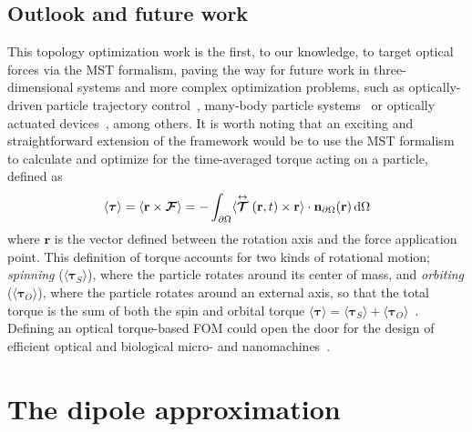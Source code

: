 \subsection*{Outlook and future work}

This topology optimization work is the first, to our knowledge, to 
target optical forces via the MST formalism, paving the way for future work in three-dimensional systems and more complex optimization problems, such as optically-driven particle
trajectory control~\cite{zemanek_perspective_2019, macdonald_microfluidic_2003, shilkin_directional_2017}, many-body particle systems~\cite{bechinger_active_2016, chang_colloquium_2018} or optically actuated devices~\cite{ivanyi_optically_2024}, among others. It is worth noting that an exciting and straightforward extension of the framework would be to use the MST formalism to calculate and optimize for the time-averaged torque acting on a particle, defined as~\cite{novotny}
\begin{equation}\label{eq:torque}
    \langle \bm{\tau} \rangle = \langle \mathbf{r} \times \bm{\mathcal{F}} \rangle = - \int_{\partial \Omega} \langle \stackrel{\leftrightarrow}{\bm{\mathcal{T}}}(\mathbf{r},t)
    \times \mathbf{r} \rangle \cdot \mathbf{n}_{\partial \Omega}(\mathbf{r}) \mathop{}\!\text{d}\Omega 
\end{equation}
where $\mathbf{r}$ is the vector defined between the rotation axis and the force application point. This definition of torque accounts
for two kinds of rotational motion; \textit{spinning} ($\langle \bm{\tau}_S \rangle$), where the particle rotates around its center of mass,
and \textit{orbiting} ($\langle \bm{\tau}_O \rangle$), where the particle rotates around an external axis, so that the total torque is the sum
of both the spin and orbital torque $\langle \bm{\tau} \rangle = \langle \bm{\tau}_S \rangle + \langle \bm{\tau}_O \rangle$~\cite{torque}.  Defining 
an optical torque-based FOM could open the door for the design of efficient optical and biological micro- and nanomachines~\cite{rotating, gluck}.

\section{The dipole approximation~\cite{ownpub1, ownpub3}}\label{sec:dip}

